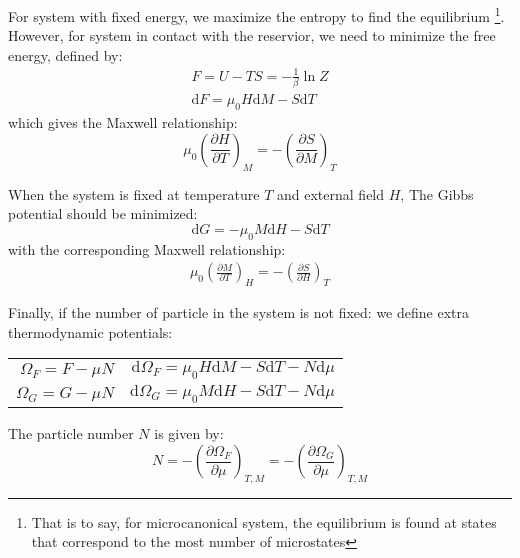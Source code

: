 \documentclass{article}
\newcommand{\pfrac}[2]{\frac{\partial #1}{\partial #2}}
\newcommand{\dnor}{\text{d}}
\begin{document}
For system with fixed energy, we maximize the entropy to find the equilibrium
\footnote{That is to say, for microcanonical system, the equilibrium is found 
at states that correspond to the most number of microstates}.
However, for system in contact with the reservior, we need to minimize the free 
energy, defined by:
\begin{gather}
    F = U - TS = -\frac{1}{\beta} \ln Z \\
    \dnor F = \mu_0 H \dnor M - S \dnor T
\end{gather}
which gives the Maxwell relationship:
\begin{equation}
    \mu_0 \left( \pfrac{H}{T} \right)_M = - \left( \pfrac{S}{M} \right)_T
\end{equation} 

When the system is fixed at temperature $T$ and external field $H$, The 
Gibbs potential should be minimized:
\begin{equation}
    \dnor G = - \mu_0 M \dnor H - S \dnor T
\end{equation}
with the corresponding Maxwell relationship:
\begin{eqnarray}
    \mu_0 \left( \pfrac{M}{T} \right)_H = - \left( \pfrac{S}{H} \right)_T
\end{eqnarray}

Finally, if the number of particle in the system is not fixed:
we define extra thermodynamic potentials:
\begin{table*}[h]
    \centering
    \begin{tabular}{rr}
     $\Omega_F = F - \mu N$ & $ \dnor \Omega_F = \mu_0 H \dnor M - S\dnor T - N \dnor \mu $ \\
     $\Omega_G = G - \mu N$ & $ \dnor \Omega_G = \mu_0 M \dnor H - S\dnor T - N \dnor \mu $ \\
     \end{tabular}
\end{table*}
The particle number $N$ is given by:
\begin{equation}
    N = - \left( \pfrac{\Omega_F}{\mu} \right)_{T,M} = - \left( \pfrac{\Omega_G}{\mu} \right)_{T,M} 
\end{equation}
\end{document}
